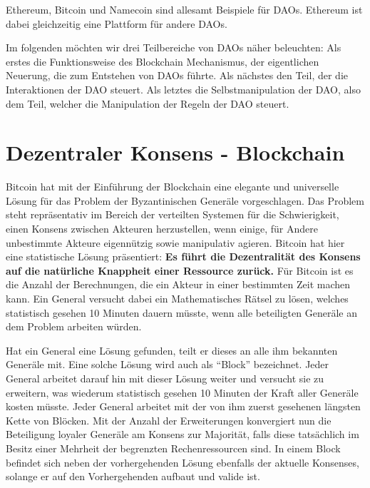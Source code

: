 \documentclass[a4paper,12pt]{report}
\begin{document}
Ethereum, Bitcoin und Namecoin sind allesamt Beispiele für DAOs. Ethereum ist dabei gleichzeitig eine Plattform für andere DAOs.

Im folgenden möchten wir drei Teilbereiche von DAOs näher beleuchten: Als erstes die Funktionsweise des Blockchain Mechanismus, der eigentlichen Neuerung, die zum Entstehen von DAOs führte. Als nächstes den Teil, der die Interaktionen der DAO steuert. Als letztes die Selbstmanipulation der DAO, also dem Teil, welcher die Manipulation der Regeln der DAO steuert.


\section{Dezentraler Konsens - Blockchain}
\label{blockchain}

Bitcoin hat mit der Einführung der Blockchain eine elegante und universelle Lösung für das Problem der Byzantinischen Generäle vorgeschlagen. Das Problem steht repräsentativ im Bereich der verteilten Systemen für die Schwierigkeit, einen Konsens zwischen Akteuren herzustellen, wenn einige, für Andere unbestimmte Akteure eigennützig sowie manipulativ agieren. 
Bitcoin hat hier eine statistische Lösung präsentiert: \textbf{Es führt die Dezentralität des Konsens auf die natürliche Knappheit einer Ressource zurück.} Für Bitcoin ist es die Anzahl der Berechnungen, die ein Akteur in einer bestimmten Zeit machen kann. Ein General versucht dabei ein Mathematisches Rätsel zu lösen, welches statistisch gesehen 10 Minuten dauern müsste, wenn alle beteiligten Generäle an dem Problem arbeiten würden. 

Hat ein General eine Lösung gefunden, teilt er dieses an alle ihm bekannten Generäle mit. Eine solche Lösung wird auch als ``Block'' bezeichnet. Jeder General arbeitet darauf hin mit dieser Lösung weiter und versucht sie zu erweitern, was wiederum statistisch gesehen 10 Minuten der Kraft aller Generäle kosten müsste. Jeder General arbeitet mit der von ihm zuerst gesehenen längsten Kette von Blöcken. Mit der Anzahl der Erweiterungen konvergiert nun die Beteiligung loyaler Generäle am Konsens zur Majorität, falls diese tatsächlich im Besitz einer Mehrheit der begrenzten Rechenressourcen sind.
In einem Block befindet sich neben der vorhergehenden Lösung ebenfalls der aktuelle Konsenses, solange er auf den Vorhergehenden aufbaut und valide ist.
\end{document}
